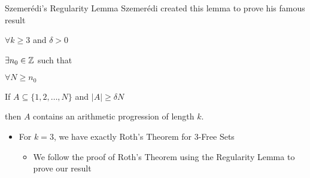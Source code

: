 \begin{frame}{Szemer\'{e}di's Regularity Lemma}
Szemer\'{e}di created this lemma to prove his famous result
\begin{theorem}
$\forall k \geq 3$ and $\delta > 0$
\begin{description}[abc]
	\item[$\bullet$] $\exists n_0 \in {\mathbb Z}$ such that
	\begin{description}[abc]
		\item[$\bullet$] $\forall N \geq n_0$
		\begin{description}[abc]
			\item[$\bullet$] If $A \subseteq \{1,2,\dotsc,N\}$ and $|A| \geq \delta N$
			\begin{description}[abc]
				\item[$\bullet$] then $A$ contains an arithmetic progression of length $k$.
			\end{description}
		\end{description}
	\end{description}
\end{description}
\end{theorem}

\begin{itemize}
	\item For $k = 3$, we have exactly Roth's Theorem for 3-Free Sets
	\begin{itemize}
		\item We follow the proof of Roth's Theorem using the Regularity Lemma to prove our result
	\end{itemize}
\end{itemize}

\end{frame}


